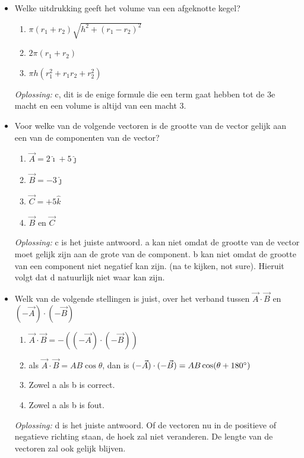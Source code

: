 \documentclass[12pt,a4paper]{article}
\begin{document}
    \begin{itemize}
        \renewcommand\labelitemi{--}
        \item Welke uitdrukking geeft het volume van een afgeknotte kegel?
        \begin{enumerate}
            [label=\alph*)]
            \item \(\pi(r_1 + r_2)\sqrt{h^2 + (r_1 - r_2)^2}\)
            \item \(2\pi(r_1 + r_2)\)
            \item \(\pi h(r_1^2 + r_1r_2 + r_2^2)\)
        \end{enumerate}
        \textit{Oplossing:} c, dit is de enige formule die een term gaat hebben tot de 3e macht en een volume is altijd van een macht 3.

        \item Voor welke van de volgende vectoren is de grootte van de vector gelijk aan een van de componenten van de vector?
        \begin{enumerate}
            [label = \alph*)]
            \item \(\vec{A} = 2\hat{\imath} + 5\hat{\jmath}\)
            \item \(\vec{B} = -3\hat{\jmath}\)
            \item \(\vec{C} = +5\hat{k}\)
            \item \(\vec{B} \text{ en } \vec{C}\)
        \end{enumerate}
        \textit{Oplossing:} c is het juiste antwoord. a kan niet omdat de grootte van de vector moet gelijk zijn aan de grote van de component. b kan niet omdat de grootte van een component niet negatief kan zijn. (na te kijken, not sure). Hieruit volgt dat d natuurlijk niet waar kan zijn.

        \item Welk van de volgende stellingen is juist, over het verband tussen \(\vec{A} \cdot \vec{B}\) en \((-\vec{A}) \cdot (-\vec{B})\)
        \begin{enumerate}
            [label=\alph*)]
            \item \(\vec{A} \cdot \vec{B} = -((-\vec{A})\cdot(-\vec{B}))\)
            \item als \(\vec{A} \cdot \vec{B} = AB\cos\theta \), dan is \((-\vec{A}) \cdot (-\vec{B}) = AB\cos(\theta + 180\degree)\)
            \item Zowel a als b is correct.
            \item Zowel a als b is fout.
        \end{enumerate}
        \textit{Oplossing:} d is het juiste antwoord.
        Of de vectoren nu in de positieve of negatieve richting staan, de hoek zal niet veranderen.
        De lengte van de vectoren zal ook gelijk blijven.


\end{itemize}
\end{document}
